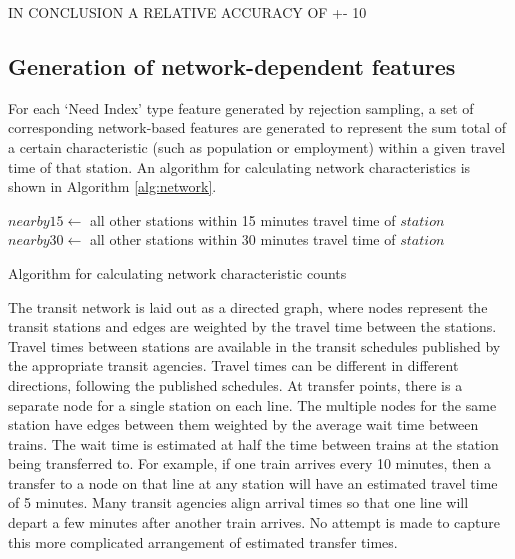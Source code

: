 \documentclass[11pt]{article}
\begin{document}
IN CONCLUSION A RELATIVE ACCURACY OF +- 10%

\subsection{Generation of network-dependent features}\label{sec:net}

For each `Need Index' type feature generated by rejection sampling, a set of corresponding network-based features are generated to represent the sum total of a certain characteristic (such as population or employment) within a given travel time of that station. An algorithm for calculating network characteristics is shown in Algorithm \ref{alg:network}. 

\begin{algorithm}
\begin{algorithmic}
	\State$nearby15 \gets$ all other stations within 15 minutes travel time of $station$
	\State$nearby30 \gets$ all other stations within 30 minutes travel time of $station$
		\EndFor
		\EndFor
	\EndFor
\EndFor
\end{algorithmic}\caption{Algorithm for calculating network characteristic counts}\label{alg:network}
\end{algorithm}

The transit network is laid out as a directed graph, where nodes represent the transit stations and edges are weighted by the travel time between the stations. Travel times between stations are available in the transit schedules published by the appropriate transit agencies. Travel times can be different in different directions, following the published schedules. At transfer points, there is a separate node for a single station on each line. The multiple nodes for the same station have edges between them weighted by the average wait time between trains. The wait time is estimated at half the time between trains at the station being transferred to. For example, if one train arrives every 10 minutes, then a transfer to a node on that line at any station will have an estimated travel time of 5 minutes. Many transit agencies align arrival times so that one line will depart a few minutes after another train arrives. No attempt is made to capture this more complicated arrangement of estimated transfer times. 
\end{document}
